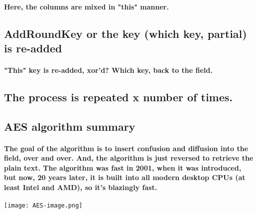 \paragraph{Here, the columns are mixed in "this" manner.}

\subsection{AddRoundKey or the key (which key, partial) is re-added}
\paragraph{"This" key is re-added, xor'd? Which key, back to the field.}


\subsection{The process is repeated x number of times.}


\subsection{AES algorithm summary}
\paragraph{The goal of the algorithm is to insert confusion and diffusion into the field, over and over. And, the algorithm is just reversed to retrieve the plain text. The algorithm was fast in 2001, when it was introduced, but now, 20 years later, it is built into all modern desktop CPUs (at least Intel and AMD), so it's blazingly fast.}

\texttt{[image: AES-image.png]}